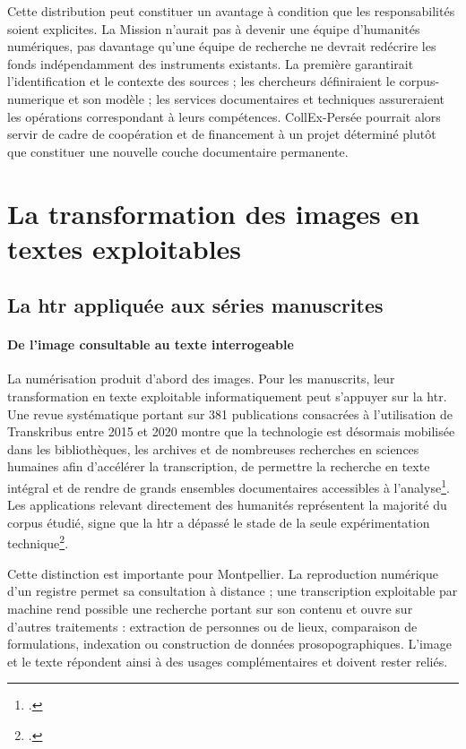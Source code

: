 Cette distribution peut constituer un avantage à condition que les responsabilités soient explicites. La Mission n'aurait pas à devenir une équipe d'humanités numériques, pas davantage qu'une équipe de recherche ne devrait redécrire les fonds indépendamment des instruments existants. La première garantirait l'identification et le contexte des sources ; les chercheurs définiraient le \gls{corpus-numerique} et son modèle ; les services documentaires et techniques assureraient les opérations correspondant à leurs compétences. CollEx-Persée pourrait alors servir de cadre de coopération et de financement à un projet déterminé plutôt que constituer une nouvelle couche documentaire permanente.



\section{La transformation des images en textes exploitables}

\subsection{La \gls{htr} appliquée aux séries manuscrites}

\paragraph{De l'image consultable au texte interrogeable}

La numérisation produit d'abord des images. Pour les manuscrits, leur transformation en texte exploitable informatiquement peut s'appuyer sur la \gls{htr}. Une revue systématique portant sur 381 publications consacrées à l'utilisation de Transkribus entre 2015 et 2020 montre que la technologie est désormais mobilisée dans les bibliothèques, les archives et de nombreuses recherches en sciences humaines afin d'accélérer la transcription, de permettre la recherche en texte intégral et de rendre de grands ensembles documentaires accessibles à l'analyse\footcite{NockelsGoodingAmesTerras2022}. Les applications relevant directement des humanités représentent la majorité du corpus étudié, signe que la \gls{htr} a dépassé le stade de la seule expérimentation technique\footcite{NockelsGoodingAmesTerras2022}.

Cette distinction est importante pour Montpellier. La reproduction numérique d'un registre permet sa consultation à distance ; une transcription exploitable par machine rend possible une recherche portant sur son contenu et ouvre sur d'autres traitements : extraction de personnes ou de lieux, comparaison de formulations, indexation ou construction de données prosopographiques. L'image et le texte répondent ainsi à des usages complémentaires et doivent rester reliés.

